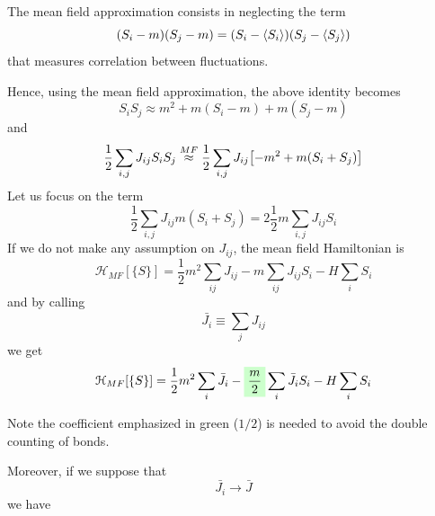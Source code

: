 \documentclass[../main/main.tex]{subfiles}
\begin{document}
\begin{remark}
The mean field approximation consists in neglecting the term
\begin{equation*}
  (S_i - m ) (S_j - m) = (S_i - \expval{S_i})(S_j - \expval{S_j})
\end{equation*}
that measures correlation between fluctuations. 
\end{remark}

Hence, using the mean field approximation, the above identity becomes
\begin{equation*}
  S_i S_j  \approx m^2 + m(S_i-m) + m(S_j-m)
\end{equation*}
and
\begin{equation*}
  \frac{1}{2} \sum_{i,j}^{} J_{ij}S_i S_j \overset{MF}{\approx } \frac{1}{2} \sum_{i,j }^{} J_{ij} \qty[-m^2+m(S_i+S_j)]
\end{equation*}
Let us focus on the term
\begin{equation}
  \frac{1}{2} \sum_{i,j }^{} J_{ij} m (S_i+S_j) = 2 \frac{1}{2} m \sum_{i,j }^{} J_{ij}  S_i
  \label{eq:11_2}
\end{equation}
If we do not make any assumption on \( J_{ij} \), the mean field Hamiltonian is
\begin{equation}
\mathcal{H}_{MF} [ \{ S \}  ] = \frac{1}{2} m^2 \sum_{ij}^{} J_{ij} - m \sum_{ij}^{} J_{ij} S_i - H \sum_{i}^{} S_i
\end{equation}
and by calling
\begin{equation*}
  \bar{J_i} \equiv  \sum_{j}^{} J_{ij}
\end{equation*}
we get
\begin{equation*}
    \mathcal{H}_{MF} [ \{ S \}  ]  = \frac{1}{2} m^2 \sum_{i}^{} \bar{J_i} - \mathcolorbox{green!20}{\frac{m}{2}} \sum_{i}^{} \bar{J_i} S_i - H \sum_{i}^{} S_i
\end{equation*}
\begin{remark}
Note the coefficient emphasized in green (\( 1/2 \)) is needed to avoid the double counting of bonds.
\end{remark}
Moreover, if we suppose that
\begin{equation*}
  \bar{J_i} \rightarrow \bar{J}
\end{equation*}
we have
\end{document}
